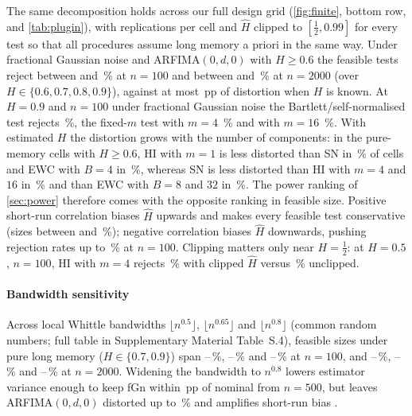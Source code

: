The same decomposition holds across our full design grid (\cref{fig:finite}, bottom row, and \cref{tab:plugin}), with
 replications per cell and $\hat H$ clipped to $[\frac12,0.99]$ for every test so that all procedures
assume long memory a priori in the same way. Under fractional Gaussian noise and ARFIMA$(0,d,0)$ with $H\ge0.6$ the
feasible tests reject between  and \,\% at $n=100$ and between
 and \,\% at $n=2000$ (over $H\in\{0.6,0.7,0.8,0.9\}$), against at
most \,pp of distortion when $H$ is known. At $H=0.9$ and $n=100$ under fractional Gaussian noise
the Bartlett/self-normalised test rejects \,\%, the fixed-$m$ test with $m=4$
\,\% and with $m=16$ \,\%. With estimated $H$ the distortion
grows with the number of components: in the  pure-memory cells with $H\ge0.6$, HI with $m=1$
is less distorted than SN in \,\% of cells and EWC with $B=4$ in \,\%,
whereas SN is less distorted than HI with $m=4$ and $16$ in \,\% and than EWC with $B=8$ and $32$
in \,\%. The power ranking of \cref{sec:power} therefore comes with the opposite ranking in
feasible size. Positive short-run correlation biases $\hat H$ upwards and makes every feasible test conservative (sizes
between  and \,\%); negative correlation biases $\hat H$ downwards, pushing
rejection rates up to \,\% at $n=100$. Clipping matters only near $H=\frac12$: at $H=0.5$,
$n=100$, HI with $m=4$ rejects \,\% with clipped $\hat H$ versus \,\%
unclipped.

\paragraph{Bandwidth sensitivity} Across local Whittle bandwidths $\lfloor n^{0.5}\rfloor$, $\lfloor n^{0.65}\rfloor$
and $\lfloor n^{0.8}\rfloor$ (common random numbers; full table in Supplementary Material Table~S.4), feasible sizes
under pure long memory ($H\in\{0.7,0.9\}$) span --\,\%,
--\,\% and --\,\% at $n=100$,
and --\,\%, --\,\% and
--\,\% at $n=2000$. Widening the bandwidth to $n^{0.8}$ lowers estimator
variance enough to keep fGn within \,pp of nominal from $n=500$, but leaves ARFIMA$(0,d,0)$
distorted up to \,\% and amplifies short-run bias \citep{Rob95}.

